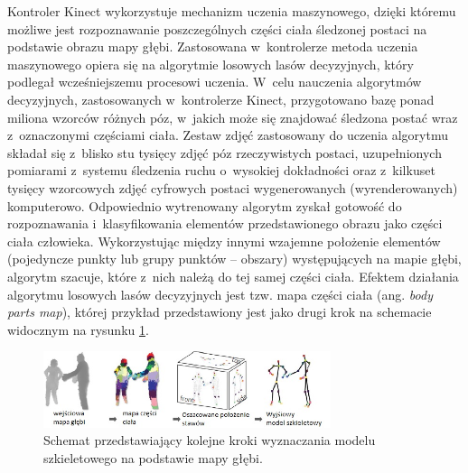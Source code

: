 Kontroler Kinect wykorzystuje mechanizm uczenia maszynowego, dzięki któremu możliwe jest rozpoznawanie poszczególnych części ciała śledzonej postaci na podstawie obrazu mapy głębi. Zastosowana w~kontrolerze metoda uczenia maszynowego opiera się na algorytmie losowych lasów decyzyjnych\cite{Criminisi2011}, który podlegał wcześniejszemu procesowi uczenia. W~celu nauczenia algorytmów decyzyjnych, zastosowanych w~kontrolerze Kinect, przygotowano bazę ponad miliona wzorców różnych póz, w~jakich może się znajdować śledzona postać wraz z~oznaczonymi częściami ciała. Zestaw zdjęć zastosowany do uczenia algorytmu składał się z~blisko stu tysięcy zdjęć póz rzeczywistych postaci, uzupełnionych pomiarami z~systemu śledzenia ruchu o~wysokiej dokładności oraz z~kilkuset tysięcy wzorcowych zdjęć cyfrowych postaci wygenerowanych (wyrenderowanych) komputerowo. Odpowiednio wytrenowany algorytm zyskał gotowość do rozpoznawania i~klasyfikowania elementów przedstawionego obrazu jako części ciała człowieka. Wykorzystując między innymi wzajemne położenie elementów (pojedyncze punkty lub grupy punktów -- obszary) występujących na mapie głębi, algorytm szacuje, które z~nich należą do tej samej części ciała. Efektem działania algorytmu losowych lasów decyzyjnych jest tzw. mapa części ciała (ang. \emph{body parts map}), której przykład przedstawiony jest jako drugi krok na schemacie widocznym na rysunku \ref{fig:literature:kinect:classificationSteps}.
																							
\begin{savenotes}
	\begin{figure}[!htp]
		\centering	
		\includegraphics[width=0.75\textwidth]{images/KinectRecognitionSteps.jpg}
		\caption{Schemat przedstawiający kolejne kroki wyznaczania modelu szkieletowego na podstawie mapy głębi.}
		\label{fig:literature:kinect:classificationSteps}
	\end{figure}
\end{savenotes}
																									
